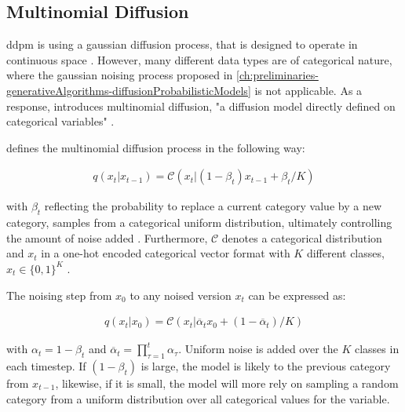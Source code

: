 \subsection{Multinomial Diffusion}
\gls{ddpm} is using a gaussian diffusion process, that is designed to operate in continuous space \cite{kotelnikov2022TabDDPMModellingTabular}.
However, many different data types are of categorical nature, where the gaussian noising process proposed in \autoref{ch:preliminaries-generativeAlgorithms-diffusionProbabilisticModels} is not applicable.
As a response, \cite{hoogeboom2021ArgmaxFlowsMultinomial} introduces multinomial diffusion, "a diffusion model directly defined on categorical variables" \cite[p, 3]{hoogeboom2021ArgmaxFlowsMultinomial}.

\cite{hoogeboom2021ArgmaxFlowsMultinomial} defines the multinomial diffusion process in the following way:

\begin{equation}
  \begin{align*}
    \label{eqn:mul_diff1}
    q(x_{t}|x_{t-1}) = \mathcal{C}(x_t|(1-\beta_t)x_{t-1}+\beta_t/K)
  \end{align*}
\end{equation}

with $\beta_t$ reflecting the probability to replace a current category value by a new category, samples from a categorical uniform distribution, ultimately controlling the amount of noise added \cite{hoogeboom2021ArgmaxFlowsMultinomial}.
Furthermore, $\mathcal{C}$ denotes a categorical distribution and $x_t$ in a one-hot encoded categorical vector format with $K$ different classes, $x_t\in\{0,1\}^K$ \cite{hoogeboom2021ArgmaxFlowsMultinomial}.

The noising step from $x_0$ to any noised version $x_t$ can be expressed as:

\begin{equation}
  \begin{align*}
    \label{eqn:mul_diff2}
    q(x_{t}|x_{0}) = \mathcal{C}(x_t|\overline{\alpha}_tx_{0}+(1-\overline{\alpha}_t)/K)
  \end{align*}
\end{equation}

with $\alpha_t = 1-\beta_t$ and $\overline{\alpha}_t = \prod_{\tau=1}^{t}\alpha_\tau$.
Uniform noise is added over the $K$ classes in each timestep.
If $(1-\beta_t)$ is large, the model is likely to the previous category from $x_{t-1}$, likewise, if it is small, 
the model will more rely on sampling a random category from a uniform distribution over all categorical values for the variable.

